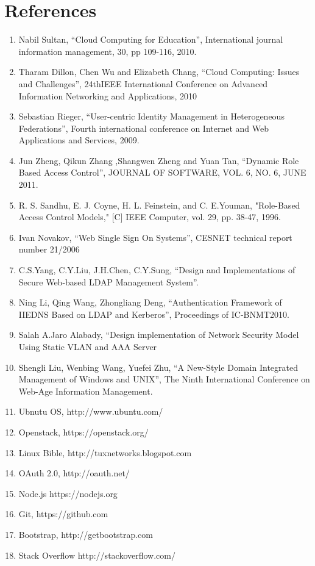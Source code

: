 \documentclass[12pt]{report}
\begin{document}
\section{References}

\begin{enumerate}
\item Nabil Sultan, ``Cloud Computing for Education”, International journal information management, 30, pp 109-116, 2010.
\item Tharam Dillon, Chen Wu and Elizabeth Chang, ``Cloud Computing: Issues and Challenges'',  24thIEEE International Conference on Advanced Information Networking and Applications, 2010 
\item Sebastian Rieger, ``User-centric Identity Management in Heterogeneous Federations'', Fourth international conference on Internet and Web Applications and Services, 2009.
\item Jun Zheng, Qikun Zhang ,Shangwen Zheng and Yuan Tan, ``Dynamic Role Based Access Control'',  JOURNAL OF SOFTWARE, VOL. 6, NO. 6, JUNE 2011.
\item R. S. Sandhu, E. J. Coyne, H. L. Feinstein, and C. E.Youman, "Role-Based Access Control Models," [C] IEEE Computer, vol. 29, pp. 38-47, 1996.
\item Ivan Novakov, ``Web Single Sign On Systems'', CESNET technical report number 21/2006
\item C.S.Yang, C.Y.Liu, J.H.Chen, C.Y.Sung, ``Design and Implementations of Secure Web-based LDAP Management System''.
\item Ning Li, Qing Wang, Zhongliang Deng, ``Authentication Framework of IIEDNS Based on LDAP and Kerberos'', Proceedings of IC-BNMT2010.
\item Salah A.Jaro Alabady, ``Design implementation of Network Security Model Using Static VLAN and AAA Server
\item Shengli Liu, Wenbing Wang, Yuefei Zhu, ``A New-Style Domain Integrated Management of Windows and UNIX'', The Ninth International Conference on Web-Age Information Management.
\item Ubnutu OS, http://www.ubuntu.com/
\item Openstack, https://openstack.org/
\item Linux Bible, http://tuxnetworks.blogspot.com
\item OAuth 2.0, http://oauth.net/
\item Node.js https://nodejs.org
\item Git, https://github.com
\item Bootstrap, http://getbootstrap.com 
\item Stack Overflow http://stackoverflow.com/
\end{enumerate}
\end{document}
